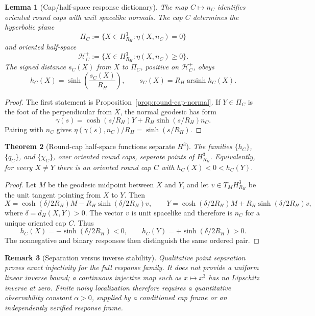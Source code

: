 \documentclass[11pt]{article}
\newtheorem{theorem}{Theorem}[section]
\newtheorem{lemma}[theorem]{Lemma}
\newtheorem{remark}[theorem]{Remark}
\begin{document}
\begin{lemma}[Cap/half-space response dictionary]\label{lem:cap-halfspace-response-dictionary}
The map \(C\mapsto n_C\) identifies oriented round caps with unit spacelike
normals. The cap \(C\) determines the hyperbolic plane
\[
\Pi_C:=\{X\in H^3_{R_H}:\eta(X,n_C)=0\}
\]
and oriented half-space
\[
\mathcal H_C^+:=\{X\in H^3_{R_H}:\eta(X,n_C)\geq0\}.
\]
The signed distance \(s_C(X)\) from \(X\) to \(\Pi_C\), positive on
\(\mathcal H_C^+\), obeys
\[
h_C(X)=\sinh\!\left(\frac{s_C(X)}{R_H}\right),
\qquad
s_C(X)=R_H\operatorname{arsinh}h_C(X).
\]
\end{lemma}

\begin{proof}
The first statement is Proposition~\ref{prop:round-cap-normal}. If
\(Y\in\Pi_C\) is the foot of the perpendicular from \(X\), the normal geodesic
has form
\[
\gamma(s)=\cosh(s/R_H)Y+R_H\sinh(s/R_H)n_C.
\]
Pairing with \(n_C\) gives \(\eta(\gamma(s),n_C)/R_H=\sinh(s/R_H)\).
\end{proof}

\begin{theorem}[Round-cap half-space functions separate \(H^3\)]
\label{thm:h3-cap-halfspace-separation}
The families \(\{h_C\}\), \(\{q_C\}\), and \(\{\chi_C\}\), over oriented round
caps, separate points of \(H^3_{R_H}\). Equivalently, for every \(X\neq Y\)
there is an oriented round cap \(C\) with \(h_C(X)<0<h_C(Y)\).
\end{theorem}

\begin{proof}
Let \(M\) be the geodesic midpoint between \(X\) and \(Y\), and let \(v\in
T_MH^3_{R_H}\) be the unit tangent pointing from \(X\) to \(Y\). Then
\[
X=\cosh(\delta/2R_H)M-R_H\sinh(\delta/2R_H)v,\qquad
Y=\cosh(\delta/2R_H)M+R_H\sinh(\delta/2R_H)v,
\]
where \(\delta=d_H(X,Y)>0\). The vector \(v\) is unit spacelike and therefore
is \(n_C\) for a unique oriented cap \(C\). Thus
\[
h_C(X)=-\sinh(\delta/2R_H)<0,\qquad
h_C(Y)=+\sinh(\delta/2R_H)>0.
\]
The nonnegative and binary responses then distinguish the same ordered pair.
\end{proof}

\begin{remark}[Separation versus inverse stability]\label{rem:h3-separation-not-stability}
Qualitative point separation proves exact injectivity for the full response
family. It does not provide a uniform linear inverse bound; a continuous
injective map such as \(x\mapsto x^3\) has no Lipschitz inverse at zero. Finite
noisy localization therefore requires a quantitative observability constant
\(\alpha>0\), supplied by a conditioned cap frame or an independently verified
response frame.
\end{remark}
\end{document}
